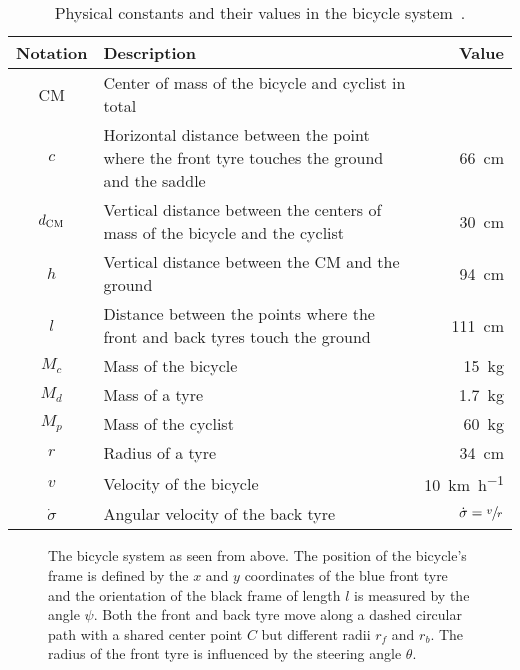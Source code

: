 \begin{table}[p]
    \centering
    \caption{Physical constants and their values in the bicycle system~\cite{randlov_learning_1998}.}
    \label{tab:bicycle_constants}
    \begin{tabularx}{\tablewidth}{cXr}
        \toprule
        Notation & Description & Value \\
        \midrule
        CM & Center of mass of the bicycle and cyclist in total & \\
        $c$ & Horizontal distance between the point where the front tyre touches the ground and the saddle & \SI{66}{\cm} \\
        $d_{\text{CM}}$ & Vertical distance between the centers of mass of the bicycle and the cyclist & \SI{30}{\cm} \\
        $h$ & Vertical distance between the CM and the ground & \SI{94}{\cm} \\
        $l$ & Distance between the points where the front and back tyres touch the ground & \SI{111}{\cm} \\
        $M_c$ & Mass of the bicycle & \SI{15}{\kg} \\
        $M_d$ & Mass of a tyre & \SI{1.7}{\kg} \\
        $M_p$ & Mass of the cyclist & \SI{60}{\kg} \\
        $r$ & Radius of a tyre & \SI{34}{\cm} \\
        $v$ & Velocity of the bicycle & \SI{10}{\km\per\hour} \\
        $\dot{\sigma}$ & Angular velocity of the back tyre & $\dot{\sigma} = \sfrac{v}{r}$ \\
        \bottomrule
    \end{tabularx}
\end{table}
\begin{figure}[p]
    \centering
    
    \caption{
        The bicycle system as seen from above.
        The position of the bicycle's frame is defined by the $x$ and $y$ coordinates of the blue front tyre and the orientation of the black frame of length $l$ is measured by the angle $\psi$.
        Both the front and back tyre move along a dashed circular path with a shared center point $C$ but different radii $r_f$ and $r_b$.
        The radius of the front tyre is influenced by the steering angle $\theta$.
    }
    \label{fig:bicycle:above}
\end{figure}
